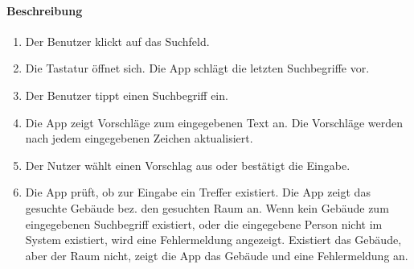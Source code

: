 \paragraph{Beschreibung}
\begin{enumerate}
    \item Der Benutzer klickt auf das Suchfeld.
    \item Die Tastatur öffnet sich. Die App schlägt die letzten Suchbegriffe vor.
    \item Der Benutzer tippt einen Suchbegriff ein.
    \item Die App zeigt Vorschläge zum eingegebenen Text an. Die Vorschläge werden nach jedem eingegebenen Zeichen aktualisiert.
    \item Der Nutzer wählt einen Vorschlag aus oder bestätigt die Eingabe.
    \item Die App prüft, ob zur Eingabe ein Treffer existiert.
     Die App zeigt das gesuchte Gebäude bez. den gesuchten Raum an.
    \subsubitem Wenn kein Gebäude zum eingegebenen Suchbegriff existiert, oder die eingegebene Person nicht im System existiert, wird eine Fehlermeldung angezeigt.
    \subsubitem Existiert das Gebäude, aber der Raum nicht, zeigt die App das Gebäude und eine Fehlermeldung an.
\end{enumerate}

